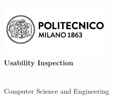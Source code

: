 \makeatletter
\begin{titlepage}
	\begin{center} 
		\includegraphics{resources/images/logo_polimi.png}\\[4ex]
		{\Huge \bfseries \sffamily Usability Inspection}\\[2ex]
		{\huge \bfseries \sffamily \@title }\\[8ex] 
		{\Large  \@author}\\[5ex] 
		Computer Science and Engineering\\[5ex]
		\@date\\[5ex]
		\fontsize{15pt}{12pt}\selectfont
	\end{center}
\end{titlepage}
\makeatother 
\thispagestyle{empty}
\setcounter{page}{1} %